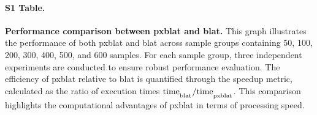 \documentclass[10pt,letterpaper]{article}
\begin{document}
{%
%
%
%
%

\paragraph*{S1 Table.}
\label{S1_Table}
{\bf Performance comparison between \gls{pxblat} and \gls{blat}.}
This graph illustrates the performance of both \gls{pxblat} and \gls{blat} across sample groups containing 50, 100, 200, 300, 400, 500, and 600 samples.
For each sample group, three independent experiments are conducted to ensure robust performance evaluation.
The efficiency of \gls{pxblat} relative to \gls{blat} is quantified through the speedup metric, calculated as the ratio of execution times \(\mathrm{time}_\textsubscript{blat} / \mathrm{time}_\textsubscript{pxblat}\).
This comparison highlights the computational advantages of \gls{pxblat} in terms of processing speed.

}
\end{document}
